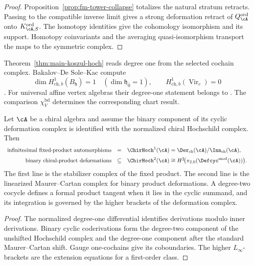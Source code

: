 \begin{proof}
Proposition~\ref{prop:fm-tower-collapse} totalizes the natural
stratum retracts.  Passing to the compatible inverse limit gives a
strong deformation retract of \(Q^{\mathrm{ord}}_\cA\) onto
\(K^{\mathrm{ord}}_{\cA,S}\).  The homotopy identities give the
cohomology isomorphism and its support.  Homotopy coinvariants and the
averaging quasi-isomorphism transport the maps to the symmetric
complex.
\end{proof}

\begin{remark}
\label{rem:chirhoch-derivation-types}
Theorem~\ref{thm:main-koszul-hoch} reads degree one from the selected
cochain complex.  Bakalov--De Sole--Kac compute
\[
 \dim H^1_{\mathrm{ch},b}(B_{\mathfrak h})=1
 \quad(\dim\mathfrak h_{\bar0}=1),
 \qquad
 H^1_{\mathrm{ch},b}(\operatorname{Vir}_c)=0
\]
\cite[Theorems~7.4 and~7.2]{BDSK21}.  For universal affine vertex
algebras their degree-one statement belongs to
\cite[Conjecture~7.5]{BDSK21}.  The comparison
\(\chi_V^{\mathrm{bd}}\) determines the corresponding chart result.

\end{remark}

\begin{proposition}
\label{prop:smooth-formal-moduli-standard}
Let \(\cA\) be a chiral algebra and assume the binary component of its
cyclic deformation complex is identified with the normalized chiral
Hochschild complex.  Then
\[
\begin{array}{rcl}
\textup{infinitesimal fixed-product automorphisms}
&=&
\ChirHoch^1(\cA)
=\Der_{\mathrm{ch}}(\cA)/\Inn_{\mathrm{ch}}(\cA),\\[2mm]
\textup{binary chiral-product deformations}
&\subseteq&
\ChirHoch^2(\cA)
\cong H^2\!\bigl(\pi_{2,0}(\Defcyc^{\mathrm{mod}}(\cA))\bigr).
\end{array}
\]
The first line is the stabilizer complex of the fixed product.  The
second line is the linearized Maurer--Cartan complex for binary product
deformations.  A degree-two cocycle defines a formal product tangent
when it lies in the cyclic summand, and its integration is governed by
the higher brackets of the deformation complex.
\end{proposition}

\begin{proof}
The normalized degree-one differential identifies derivations modulo
inner derivations.  Binary cyclic coderivations form the degree-two
component of the unshifted Hochschild complex and the degree-one
component after the standard Maurer--Cartan shift.  Gauge
one-cochains give its coboundaries.  The higher \(L_\infty\)-brackets
are the extension equations for a first-order class.
\end{proof}

